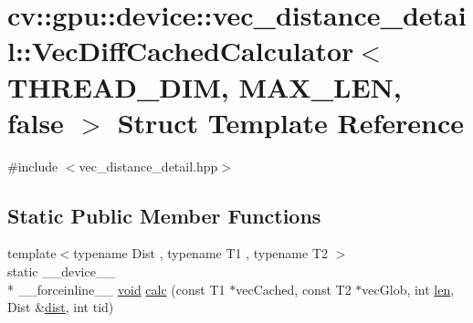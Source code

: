 \hypertarget{structcv_1_1gpu_1_1device_1_1vec__distance__detail_1_1VecDiffCachedCalculator_3_01THREAD__DIM_00_01MAX__LEN_00_01false_01_4}{\section{cv\-:\-:gpu\-:\-:device\-:\-:vec\-\_\-distance\-\_\-detail\-:\-:Vec\-Diff\-Cached\-Calculator$<$ T\-H\-R\-E\-A\-D\-\_\-\-D\-I\-M, M\-A\-X\-\_\-\-L\-E\-N, false $>$ Struct Template Reference}
\label{structcv_1_1gpu_1_1device_1_1vec__distance__detail_1_1VecDiffCachedCalculator_3_01THREAD__DIM_00_01MAX__LEN_00_01false_01_4}
}


{\ttfamily \#include $<$vec\-\_\-distance\-\_\-detail.\-hpp$>$}

\subsection*{Static Public Member Functions}
\begin{DoxyCompactItemize}
\item 
{\footnotesize template$<$typename Dist , typename T1 , typename T2 $>$ }\\static \-\_\-\-\_\-device\-\_\-\-\_\- \\*
\-\_\-\-\_\-forceinline\-\_\-\-\_\- \hyperlink{legacy_8hpp_a8bb47f092d473522721002c86c13b94e}{void} \hyperlink{structcv_1_1gpu_1_1device_1_1vec__distance__detail_1_1VecDiffCachedCalculator_3_01THREAD__DIM_00_01MAX__LEN_00_01false_01_4_a54fbfa3135b9fa6927f60d782ce50b15}{calc} (const T1 $\ast$vec\-Cached, const T2 $\ast$vec\-Glob, int \hyperlink{core__c_8h_accb79be93f4fbcaa15b5a7670569c9f8}{len}, Dist \&\hyperlink{legacy_8hpp_ae895c2003a87eda49126845b7ac3688e}{dist}, int tid)
\end{DoxyCompactItemize}


